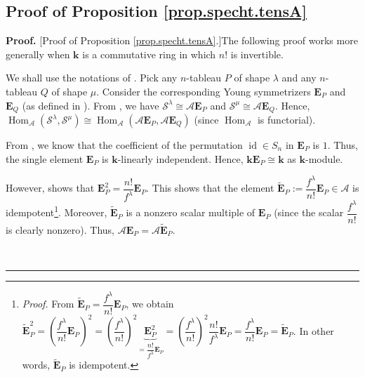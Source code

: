 \documentclass[numbers=enddot,12pt,final,onecolumn,notitlepage]{scrartcl}%
\theoremstyle{definition}
\newenvironment{proof}[1][Proof]{\noindent\textbf{#1.} }{\ \rule{0.5em}{0.5em}}
\begin{document}
\subsection{\label{subsec.apx.proofs.specht.tensA}Proof of Proposition
\ref{prop.specht.tensA}}

\begin{proof}
[Proof of Proposition \ref{prop.specht.tensA}.]The following proof works more
generally when $\mathbf{k}$ is a commutative ring in which $n!$ is invertible.

We shall use the notations of \cite[Chapter 5]{sga}. Pick any $n$-tableau $P$
of shape $\lambda$ and any $n$-tableau $Q$ of shape $\mu$. Consider the
corresponding Young symmetrizers $\mathbf{E}_{P}$ and $\mathbf{E}_{Q}$ (as
defined in \cite[Definition 5.11.1]{sga}). From \cite[(228)]{sga}, we have
$\mathcal{S}^{\lambda}\cong\mathcal{A}\mathbf{E}_{P}$ and $\mathcal{S}^{\mu
}\cong\mathcal{A}\mathbf{E}_{Q}$. Hence, $\operatorname*{Hom}%
\nolimits_{\mathcal{A}}\left(  \mathcal{S}^{\lambda},\mathcal{S}^{\mu}\right)
\cong\operatorname*{Hom}\nolimits_{\mathcal{A}}\left(  \mathcal{A}%
\mathbf{E}_{P},\mathcal{A}\mathbf{E}_{Q}\right)  $ (since $\operatorname*{Hom}%
\nolimits_{\mathcal{A}}$ is functorial).

From \cite[Lemma 5.11.13]{sga}, we know that the coefficient of the
permutation $\operatorname*{id}\in S_{n}$ in $\mathbf{E}_{P}$ is $1$. Thus,
the single element $\mathbf{E}_{P}$ is $\mathbf{k}$-linearly independent.
Hence, $\mathbf{kE}_{P}\cong\mathbf{k}$ as $\mathbf{k}$-module.

However, \cite[Theorem 5.11.3]{sga} shows that $\mathbf{E}_{P}^{2}=\dfrac
{n!}{f^{\lambda}}\mathbf{E}_{P}$. This shows that the element
$\widetilde{\mathbf{E}}_{P}:=\dfrac{f^{\lambda}}{n!}\mathbf{E}_{P}%
\in\mathcal{A}$ is idempotent\footnote{\textit{Proof.} From
$\widetilde{\mathbf{E}}_{P}=\dfrac{f^{\lambda}}{n!}\mathbf{E}_{P}$, we obtain
$\widetilde{\mathbf{E}}_{P}^{2}=\left(  \dfrac{f^{\lambda}}{n!}\mathbf{E}%
_{P}\right)  ^{2}=\left(  \dfrac{f^{\lambda}}{n!}\right)  ^{2}%
\underbrace{\mathbf{E}_{P}^{2}}_{=\dfrac{n!}{f^{\lambda}}\mathbf{E}_{P}%
}=\left(  \dfrac{f^{\lambda}}{n!}\right)  ^{2}\dfrac{n!}{f^{\lambda}%
}\mathbf{E}_{P}=\dfrac{f^{\lambda}}{n!}\mathbf{E}_{P}=\widetilde{\mathbf{E}%
}_{P}$. In other words, $\widetilde{\mathbf{E}}_{P}$ is idempotent.}.
Moreover, $\widetilde{\mathbf{E}}_{P}$ is a nonzero scalar multiple of
$\mathbf{E}_{P}$ (since the scalar $\dfrac{f^{\lambda}}{n!}$ is clearly
nonzero). Thus, $\mathcal{A}\mathbf{E}_{P}=\mathcal{A}\widetilde{\mathbf{E}%
}_{P}$.


\end{proof}
\end{document}
